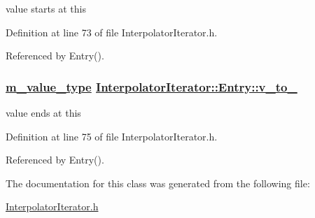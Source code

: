 value starts at this 



Definition at line 73 of file Interpolator\-Iterator.h.

Referenced by Entry().\hypertarget{classInterpolatorIterator_1_1Entry_o3}{
\subsubsection[v\_\-to\_\-]{\setlength{\rightskip}{0pt plus 5cm}\hyperlink{Types_8h_a3}{m\_\-value\_\-type} \hyperlink{classInterpolatorIterator_1_1Entry_o3}{Interpolator\-Iterator::Entry::v\_\-to\_\-}}}
\label{classInterpolatorIterator_1_1Entry_o3}


value ends at this 



Definition at line 75 of file Interpolator\-Iterator.h.

Referenced by Entry().

The documentation for this class was generated from the following file:\begin{CompactItemize}
\item 
\hyperlink{InterpolatorIterator_8h}{Interpolator\-Iterator.h}\end{CompactItemize}
